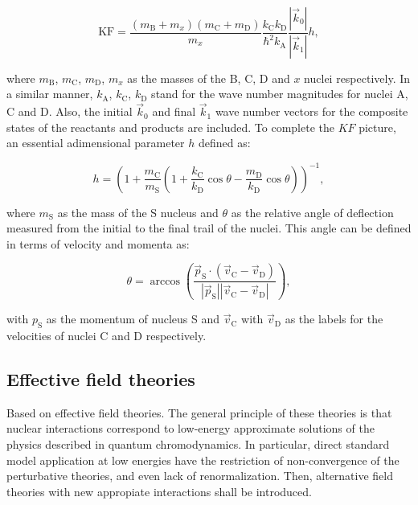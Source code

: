\documentclass[openany]{book}
\begin{document}
\begin{equation}\label{eq:special_THM_kinematicFactor}
	\mathrm{KF} = \frac{(m_\mathrm{B} + m_x)(m_\mathrm{C} + m_\mathrm{D})}{m_x} \frac{k_\mathrm{C} k_\mathrm{D}}{\hbar^2 k_\mathrm{A}} \frac{|\vec k_0|}{|\vec k_1|} h,
\end{equation}

where $m_{\mathrm{B}}$,  $m_{\mathrm{C}}$,  $m_{\mathrm{D}}$, $m_x$ as the masses of the B, C, D and $x$ nuclei respectively. In a similar manner, $k_\mathrm{A}$,  $k_\mathrm{C}$, $k_\mathrm{D}$ stand for the wave number magnitudes for nuclei A, C and D. Also, the initial $\vec k_0$ and final $\vec k_1$ wave number vectors for the composite states of the reactants and products are included. To complete the $KF$ picture, an essential adimensional parameter $h$  defined as: 

\begin{equation}\label{eq:special_THM_hParameter}
	 h = \left( 1 + \frac{m_\mathrm{C}}{m_\mathrm{S}} \left( 1 + \frac{k_\mathrm{C}}{k_\mathrm{D}} \cos \theta - \frac{m_\mathrm{D}}{k_\mathrm{D}} \cos \theta \right) \right)^{-1},
\end{equation}

where $m_\mathrm{S}$ as the mass of the S nucleus and $\theta$ as the relative angle of deflection measured from the initial to the final trail of the nuclei. This angle can be defined in terms of velocity and momenta as: 

\begin{equation}\label{eq:special_THM_angle}
	\theta = \arccos {\left( \frac{\vec p_\mathrm{S} \cdot (\vec v_\mathrm{C} - \vec v_\mathrm{D})}{|\vec p_\mathrm{S}| |\vec v_\mathrm{C} - \vec v_\mathrm{D}|} \right)},
\end{equation}

with $p_\mathrm{S}$ as the momentum of nucleus S and $\vec v_\mathrm{C}$ with  $\vec v_\mathrm{D}$ as the labels for the velocities of nuclei C and D respectively. 

\subsection{Effective field theories} \label{sub:special_effectiveField}

Based on effective field theories. The general principle of these theories is that nuclear interactions correspond to low-energy approximate solutions of the physics described in quantum chromodynamics. In particular, direct standard model application at low energies have the restriction of non-convergence of the perturbative theories, and even lack of renormalization. Then, alternative field theories with new appropiate interactions shall be introduced. \\
\end{document}
